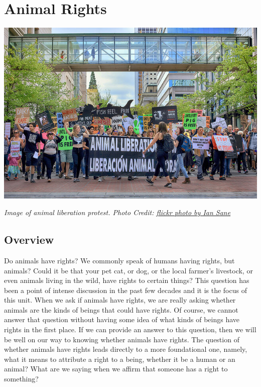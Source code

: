 \documentclass[
]{book}
\begin{document}
\hypertarget{animal-rights}{%
\chapter{Animal Rights}\label{animal-rights}}

\includegraphics{assets/unit_7/U7_43699044114_5156812c09_z.jpg}

\emph{Image of animal liberation protest. Photo Credit: \href{https://flickr.com/photos/31246066}{flickr photo by Ian Sane}}

\hypertarget{overview-6}{%
\section*{Overview}\label{overview-6}}

Do animals have rights? We commonly speak of humans having rights, but animals? Could it be that your pet cat, or dog, or the local farmer's livestock, or even animals living in the wild, have rights to certain things? This question has been a point of intense discussion in the past few decades and it is the focus of this unit.
When we ask if animals have rights, we are really asking whether animals are the kinds of beings that could have rights. Of course, we cannot answer that question without having some idea of what kinds of beings have rights in the first place. If we can provide an answer to this question, then we will be well on our way to knowing whether animals have rights.
The question of whether animals have rights leads directly to a more foundational one, namely, what it means to attribute a right to a being, whether it be a human or an animal? What are we saying when we affirm that someone has a right to something?
\end{document}
